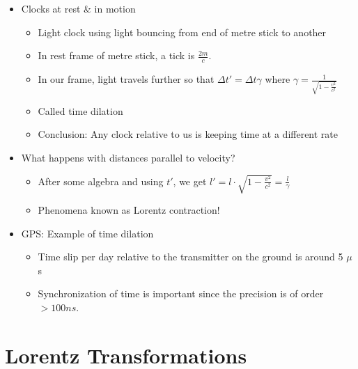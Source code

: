 \documentclass[12pt]{article}
\begin{document}
\begin{itemize}
\begin{itemize}
    \end{itemize}
    \item Clocks at rest \& in motion \begin{itemize}
        \item Light clock using light bouncing from end of metre stick to another
        \item In rest frame of metre stick, a tick is $\frac{2m}{c}$. 
        \item In our frame, light travels further so that $\Delta t' = \Delta t \gamma$ where $\gamma = \frac{1}{\sqrt{1 - \frac{v^2}{c^2}}}$
        \item Called time dilation
        \item Conclusion: Any clock relative to us is keeping time at a different rate
    \end{itemize}
    \item What happens with distances parallel to velocity? \begin{itemize}
        \item After some algebra and using $t'$, we get $l' = l \cdot \sqrt{1 - \frac{v^2}{c^2}} = \frac{l}{\gamma}$
        \item Phenomena known as Lorentz contraction!
    \end{itemize}
    \item GPS: Example of time dilation \begin{itemize}
        \item Time slip per day relative to the transmitter on the ground is around 5 $\mu$ s
        \item Synchronization of time is important since the precision is of order $ > 100 ns$. 
    \end{itemize}
\end{itemize}



\section{Lorentz Transformations}
\end{document}
